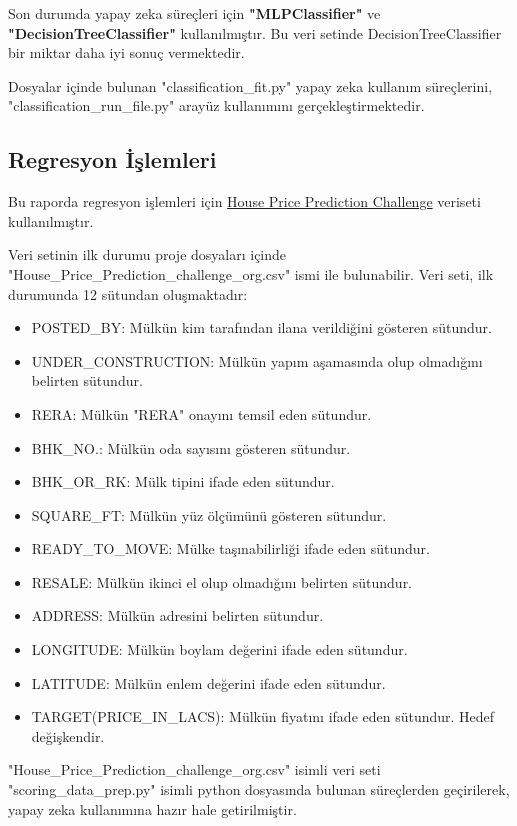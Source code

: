 Son durumda yapay zeka süreçleri için \textbf{"MLPClassifier"} ve \textbf{"DecisionTreeClassifier"} kullanılmıştır. Bu veri setinde DecisionTreeClassifier bir miktar daha iyi sonuç vermektedir.

Dosyalar içinde bulunan "classification\_fit.py" yapay zeka kullanım süreçlerini, "classification\_run\_file.py" arayüz kullanımını gerçekleştirmektedir.

\newpage
\subsection{Regresyon İşlemleri}

Bu raporda regresyon işlemleri için  \href{https://www.kaggle.com/datasets/anmolkumar/house-price-prediction-challenge/data}{House Price Prediction Challenge} veriseti kullanılmıştır.

Veri setinin ilk durumu proje dosyaları içinde "House\_Price\_Prediction\_challenge\_org.csv" ismi ile bulunabilir. Veri seti, ilk durumunda 12 sütundan oluşmaktadır:
\begin{small}
\begin{itemize}
\item POSTED\_BY: Mülkün kim tarafından ilana verildiğini gösteren sütundur.
\item UNDER\_CONSTRUCTION: Mülkün yapım aşamasında olup olmadığını belirten sütundur.
\item RERA: Mülkün "RERA" onayını temsil eden sütundur.
\item BHK\_NO.: Mülkün oda sayısını gösteren sütundur.
\item BHK\_OR\_RK: Mülk tipini ifade eden sütundur.
\item SQUARE\_FT: Mülkün yüz ölçümünü gösteren sütundur.
\item READY\_TO\_MOVE: Mülke taşınabilirliği ifade eden sütundur.
\item RESALE: Mülkün ikinci el olup olmadığını belirten sütundur.
\item ADDRESS: Mülkün adresini belirten sütundur.
\item LONGITUDE: Mülkün boylam değerini ifade eden sütundur.
\item LATITUDE: Mülkün enlem değerini ifade eden sütundur.
\item TARGET(PRICE\_IN\_LACS): Mülkün fiyatını ifade eden sütundur. Hedef değişkendir.
\end{itemize}
\end{small}

"House\_Price\_Prediction\_challenge\_org.csv" isimli veri seti "scoring\_data\_prep.py" isimli python dosyasında bulunan süreçlerden geçirilerek, yapay zeka kullanımına hazır hale getirilmiştir. 

